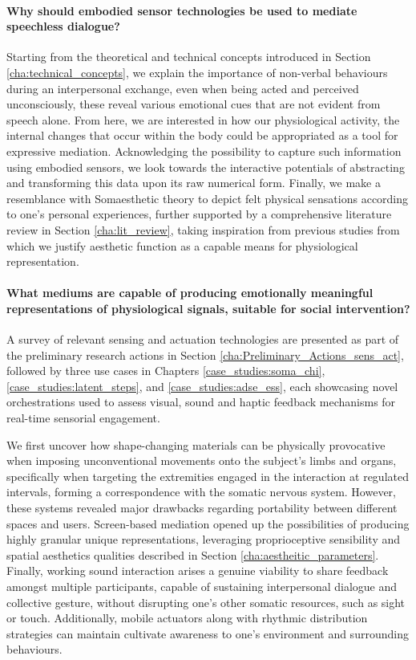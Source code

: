 \paragraph{Why should embodied sensor technologies be used to mediate speechless dialogue?}

Starting from the theoretical and technical concepts introduced in Section \ref{cha:technical_concepts}, we explain the importance of non-verbal behaviours during an interpersonal exchange, even when being acted and perceived unconsciously, these reveal various emotional cues that are not evident from speech alone. From here, we are interested in how our physiological activity, the internal changes that occur within the body could be appropriated as a tool for expressive mediation. Acknowledging the possibility to capture such information using embodied sensors, we look towards the interactive potentials of abstracting and transforming this data upon its raw numerical form. Finally, we make a resemblance with Somaesthetic theory to depict felt physical sensations according to one's personal experiences, further supported by a comprehensive literature review in Section \ref{cha:lit_review}, taking inspiration from previous studies from which we justify aesthetic function as a capable means for physiological representation.

\paragraph{What mediums are capable of producing emotionally meaningful representations of physiological signals, suitable for social intervention?}

A survey of relevant sensing and actuation technologies are presented as part of the preliminary research actions in Section \ref{cha:Preliminary_Actions_sens_act}, followed by three use cases in Chapters \ref{case_studies:soma_chi}, \ref{case_studies:latent_steps}, and \ref{case_studies:adse_ess}, each showcasing novel orchestrations used to assess visual, sound and haptic feedback mechanisms for real-time sensorial engagement.

We first uncover how shape-changing materials can be physically provocative when imposing unconventional movements onto the subject's limbs and organs, specifically when targeting the extremities engaged in the interaction at regulated intervals, forming a correspondence with the somatic nervous system. However, these systems revealed major drawbacks regarding portability between different spaces and users. Screen-based mediation opened up the possibilities of producing highly granular unique representations, leveraging proprioceptive sensibility and spatial aesthetics qualities described in Section \ref{cha:aestheitic_parameters}. Finally, working sound interaction arises a genuine viability to share feedback amongst multiple participants, capable of sustaining interpersonal dialogue and collective gesture, without disrupting one's other somatic resources, such as sight or touch. Additionally, mobile actuators along with rhythmic distribution strategies can maintain cultivate awareness to one's environment and surrounding behaviours.

